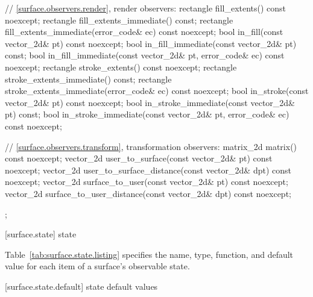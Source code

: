 \begin{codeblock}
{{{{{    // \ref{surface.observers.render}, render observers:
    rectangle fill_extents() const noexcept;
    rectangle fill_extents_immediate() const;
    rectangle fill_extents_immediate(error_code& ec) const noexcept;
    bool in_fill(const vector_2d& pt) const noexcept;
    bool in_fill_immediate(const vector_2d& pt) const;
    bool in_fill_immediate(const vector_2d& pt, error_code& ec) const noexcept;
    rectangle stroke_extents() const noexcept;
    rectangle stroke_extents_immediate() const;
    rectangle stroke_extents_immediate(error_code& ec) const noexcept;
    bool in_stroke(const vector_2d& pt) const noexcept;
    bool in_stroke_immediate(const vector_2d& pt) const;
    bool in_stroke_immediate(const vector_2d& pt, error_code& ec) const 
      noexcept;
    
    // \ref{surface.observers.transform}, transformation observers:
    matrix_2d matrix() const noexcept;
    vector_2d user_to_surface(const vector_2d& pt) const noexcept;
    vector_2d user_to_surface_distance(const vector_2d& dpt) const noexcept;
    vector_2d surface_to_user(const vector_2d& pt) const noexcept;
    vector_2d surface_to_user_distance(const vector_2d& dpt) const noexcept;
  };
} } } }
\end{codeblock}

 [surface.state] { state}

\pnum
Table~\ref{tab:surface.state.listing} specifies the name, type, function, and default value for each item of a surface's observable state.

 [surface.state.default] { state default values}

